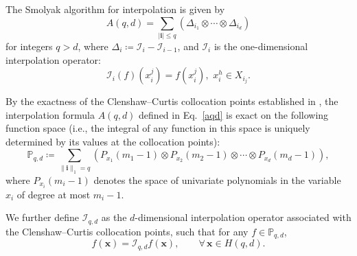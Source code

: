 The Smolyak algorithm for interpolation is given by
\begin{equation}
A(q, d) = \sum_{|\mathbf{i}| \leq q} (\Delta_{i_1} \otimes \cdots \otimes \Delta_{i_d})
\label{aqd}
\end{equation}
for integers $q > d$, where $\Delta_{i}\coloneqq \mathcal{I}_i-\mathcal{I}_{i-1}$, and $\mathcal{I}_i$ is the one-dimensional interpolation operator:
\begin{equation}
\mathcal{I}_i(f)(x_i^j) = f(x_i^j), \,\, x_i^h\in X_{i_j}.%
\end{equation}

By the exactness of the Clenshaw--Curtis collocation points established in \cite{novak1996high}, the interpolation formula $A(q,d)$ defined in Eq.~\eqref{aqd} is exact on the following function space (i.e., the integral of any function in this space is uniquely determined by its values at the collocation points):
\begin{equation}
\mathbb{P}_{q,d} \coloneqq 
\sum_{\|\mathbf{i}\|_1 = q}
\left(
P_{x_1}(m_1-1) \otimes P_{x_2}(m_2-1) \otimes \cdots \otimes P_{x_d}(m_d-1)
\right),
\end{equation}
where $P_{x_i}(m_i-1)$ denotes the space of univariate polynomials in the variable $x_i$ of degree at most $m_i-1$.

We further define $\mathcal{I}_{q,d}$ as the $d$-dimensional interpolation operator associated with the Clenshaw--Curtis collocation points, such that for any $f \in \mathbb{P}_{q,d}$,
\begin{equation}
   f(\bm{x}) = \mathcal{I}_{q,d} f(\bm{x}), \qquad \forall\, \bm{x} \in H(q,d). 
\end{equation}

